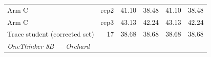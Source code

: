 \begin{table}[t]
{\begin{tabular}{lrrrrr}
Arm C & rep2 & 41.10 & 38.48 & 41.10 & 38.48 \\
Arm C & rep3 & 43.13 & 42.24 & 43.13 & 42.24 \\
Trace student (corrected set) & 17 & 38.68 & 38.68 & 38.68 & 38.68 \\
\midrule
\multicolumn{6}{l}{\textit{OneThinker-8B --- Orchard}} \\

\end{tabular}}
\end{table}
